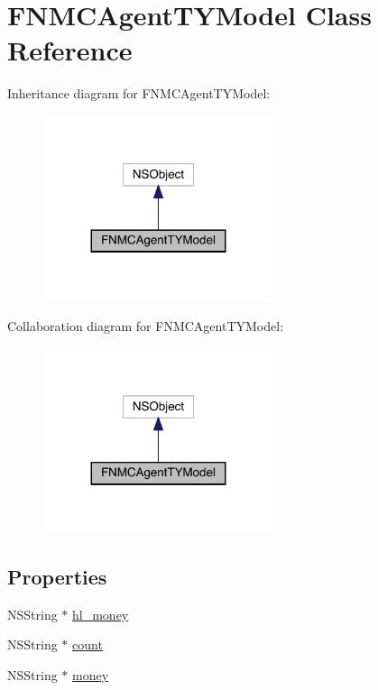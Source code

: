 \hypertarget{interface_f_n_m_c_agent_t_y_model}{}\section{F\+N\+M\+C\+Agent\+T\+Y\+Model Class Reference}
\label{interface_f_n_m_c_agent_t_y_model}


Inheritance diagram for F\+N\+M\+C\+Agent\+T\+Y\+Model\+:\nopagebreak
\begin{figure}[H]
\begin{center}
\leavevmode
\includegraphics[width=191pt]{interface_f_n_m_c_agent_t_y_model__inherit__graph}
\end{center}
\end{figure}


Collaboration diagram for F\+N\+M\+C\+Agent\+T\+Y\+Model\+:\nopagebreak
\begin{figure}[H]
\begin{center}
\leavevmode
\includegraphics[width=191pt]{interface_f_n_m_c_agent_t_y_model__coll__graph}
\end{center}
\end{figure}
\subsection*{Properties}
\begin{DoxyCompactItemize}
\item 
N\+S\+String $\ast$ \mbox{\hyperlink{interface_f_n_m_c_agent_t_y_model_af3761bf76f63aea2bc04d289db105880}{hl\+\_\+money}}
\item 
N\+S\+String $\ast$ \mbox{\hyperlink{interface_f_n_m_c_agent_t_y_model_a77df06773d1fea023578fa02912d650f}{count}}
\item 
N\+S\+String $\ast$ \mbox{\hyperlink{interface_f_n_m_c_agent_t_y_model_a813d3ea21cff00bad224f6ef2a785d9c}{money}}
\end{DoxyCompactItemize}


